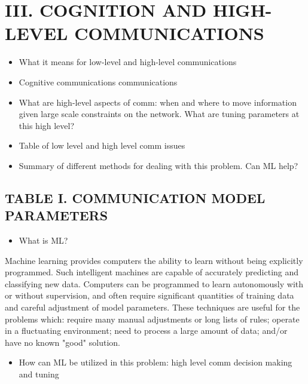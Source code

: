 \documentclass[11pt]{article}
\begin{document}
\section*{III. COGNITION AND HIGH-LEVEL COMMUNICATIONS}
\label{sec:orgea7d4b9}

\begin{itemize}
\item What it means for low-level and high-level communications

\item Cognitive communications communications

\item What are high-level aspects of comm: when and where to move information given
large scale constraints on the network. What are tuning parameters at this
high level?

\item Table of low level and high level comm issues

\item Summary of different methods for dealing with this problem. Can ML help?
\end{itemize}

\subsection*{TABLE I. COMMUNICATION MODEL PARAMETERS}
\label{sec:org37e872b}

\begin{itemize}
\item What is ML?
\end{itemize}

Machine learning provides computers the ability to learn without being
explicitly programmed.  Such intelligent machines are capable of accurately
predicting and classifying new data.  Computers can be programmed to learn
autonomously with or without supervision, and often require significant
quantities of training data and careful adjustment of model parameters.  These
techniques are useful for the problems which: require many manual adjustments or
long lists of rules; operate in a fluctuating environment; need to process a
large amount of data; and/or have no known "good" solution.

\begin{itemize}
\item How can ML be utilized in this problem: high level comm decision making and
tuning
\end{itemize}
\end{document}
